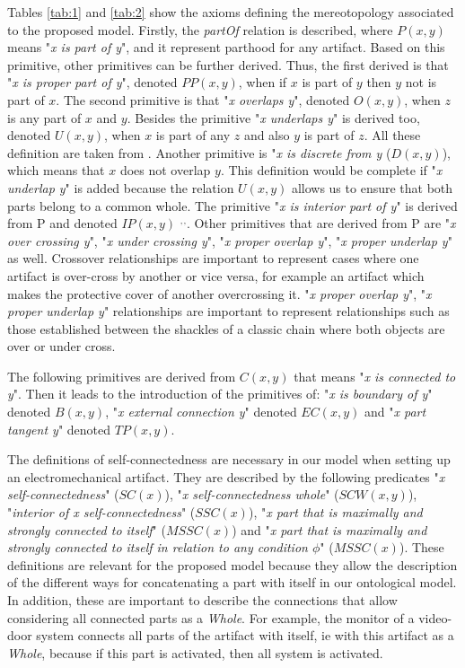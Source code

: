 \documentclass[runningheads,a4paper]{llncs}
\begin{document}
Tables \ref{tab:1} and \ref{tab:2} show the axioms defining the mereotopology associated to the proposed model. Firstly, the \emph{partOf} relation is described, where $P(x,y)$ means "\emph{x is part of y}", and it represent parthood for any artifact. Based on this primitive, other primitives can be further derived. Thus, the first derived is that "\emph{x is proper part of y}", denoted $PP(x,y)$, when if $x$ is part of $y$ then $y$ not is part of $x$. The second primitive is that "\emph{x overlaps y}", denoted $O(x,y)$, when $z$ is any part of $x$ and $y$. Besides the primitive "\emph{x underlaps y}" is derived too, denoted $U(x,y)$, when $x$ is part of any $z$ and also $y$ is part of $z$. All these definition are taken from \cite{varzi1996parts}. Another primitive is "\emph{x is discrete from y} ($D(x,y)$), which means that $x$ does not overlap $y$\cite{smith1996mereotopology}. This definition would be complete if "\emph{x underlap y}" is added because the relation $U(x,y)$ allows us to ensure that both parts belong to a common whole. The primitive "\emph{x is interior part of y}" is derived from P and denoted $IP(x,y)$ \cite{smith1996mereotopology}$^,$\cite{varzi1993bbm}$^,$\cite{varzi1996parts}. Other primitives that are derived from P are "\emph{x over crossing y}", "\emph{x under crossing y}", "\emph{x proper overlap y}", "\emph{x proper underlap y}"\cite{varzi1996parts} as well. Crossover relationships are important to represent cases where one artifact is over-cross by another or vice versa, for example an artifact which makes the protective cover of another overcrossing it. "\emph{x proper overlap y}", "\emph{x proper underlap y}" relationships are important to represent relationships such as those established between the shackles of a classic chain where both objects are over or under cross.

The following primitives are derived from $C(x,y)$ that means "\emph{x is connected to y}". Then it leads to the introduction of the primitives of: "\emph{x is boundary of y}" denoted $B(x,y)$, "\emph{x external connection y}" denoted $EC(x,y)$ and "\emph{x part tangent y}" denoted $TP(x,y)$. 

The definitions of self-connectedness are necessary in our model when setting up an electromechanical artifact\cite{varzi1996parts}. They are described by the following predicates "\emph{x self-connectedness}" ($SC(x)$), "\emph{x self-connectedness whole}" ($SCW(x,y)$), "\emph{interior of x self-connectedness}" ($SSC(x)$), "\emph{x part that is maximally and strongly connected to itself}" ($MSSC(x)$) and "\emph{x part that is maximally and strongly connected to itself in relation to any condition $\phi$}" ($MSSC(x)$). These definitions are relevant for the proposed model because they allow the description of the different ways for concatenating a part with itself in our ontological model. In addition, these are important to describe the connections that allow considering all connected parts as a \textit{Whole}.  For example, the monitor of a video-door system connects all parts of the artifact with itself, ie with this artifact as a \textit{Whole}, because if this part is activated, then all system is activated.
\end{document}
